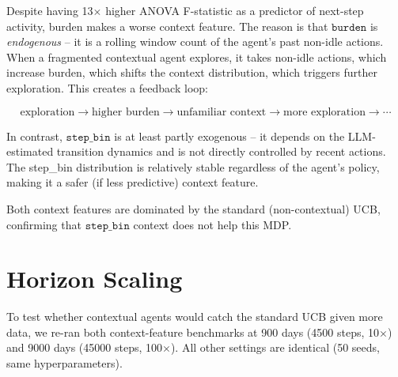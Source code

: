 \documentclass[11pt]{article}
\begin{document}
Despite having 13$\times$ higher ANOVA F-statistic as a predictor of next-step activity, burden makes a worse context feature. The reason is that $\texttt{burden}$ is \emph{endogenous} -- it is a rolling window count of the agent's past non-idle actions. When a fragmented contextual agent explores, it takes non-idle actions, which increase burden, which shifts the context distribution, which triggers further exploration. This creates a feedback loop:

\[
\text{exploration} \rightarrow \text{higher burden} \rightarrow \text{unfamiliar context} \rightarrow \text{more exploration} \rightarrow \cdots
\]

In contrast, $\texttt{step\_bin}$ is at least partly exogenous -- it depends on the LLM-estimated transition dynamics and is not directly controlled by recent actions. The step\_bin distribution is relatively stable regardless of the agent's policy, making it a safer (if less predictive) context feature.

Both context features are dominated by the standard (non-contextual) UCB, confirming that $\texttt{step\_bin}$ context does not help this MDP.

\section{Horizon Scaling}

To test whether contextual agents would catch the standard UCB given more data, we re-ran both context-feature benchmarks at 900 days (4500 steps, 10$\times$) and 9000 days (45000 steps, 100$\times$). All other settings are identical (50 seeds, same hyperparameters).
\end{document}
